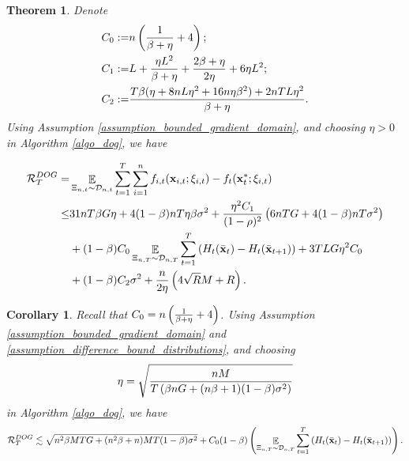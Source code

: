 \documentclass{article}
\newtheorem{Theorem}{\bf{Theorem}}
\newtheorem{Corollary}{\bf{Corollary}}
\begin{document}
\begin{Theorem}
\label{theorem_regret_upper_bound}
Denote 
\begin{align}
\nonumber
C_0 := & n\left( \frac{1}{\beta + \eta} + 4 \right); \\ \nonumber
C_1 := & L +  \frac{\eta L^2}{\beta + \eta} + \frac{2\beta + \eta}{2\eta} + 6\eta L^2; \\ \nonumber
C_2 := & \frac{T\beta(\eta + 8nL\eta^2 + 16n\eta\beta^2) + 2nTL\eta^2}{\beta + \eta }.
\end{align} Using Assumption \ref{assumption_bounded_gradient_domain}, and choosing $\eta>0$ in Algorithm \ref{algo_dog}, we have

\begin{align}
\nonumber
{\mathcal{R}}_T^{DOG} = & \mathop{\mathbb{E}}_{ \Xi_{n,t} \sim \mathcal{D}_{n,t} } \sum_{t=1}^T\sum_{i=1}^n f_{i,t}({\bf x}_{i,t};\xi_{i,t}) - f_t({\bf x}_t^\ast;\xi_{i,t}) \\ \nonumber
\le & 31 nT\beta G \eta + 4(1-\beta)nT\eta \beta\sigma^2 +  \frac{\eta^2C_1}{(1-\rho)^2}   \left(  6nTG + 4(1-\beta)nT \sigma^2  \right) \\ \nonumber 
&+ (1-\beta) C_0  \mathop{\mathbb{E}}_{ \Xi_{n,T} \sim \mathcal{D}_{n,T} }\sum_{t=1}^T \left( H_t(\bar{{\bf x}}_t) - H_t(\bar{{\bf x}}_{t+1}) \right) + 3TLG\eta^2C_0 \\ \nonumber 
& + (1-\beta) C_2  \sigma^2  + \frac{n}{2\eta}\left(  4\sqrt{R}M + R   \right).
\end{align} 
\end{Theorem}


\begin{Corollary}
Recall that $C_0 = n\left(  \frac{1}{\beta + \eta} + 4 \right)$.
Using Assumption \ref{assumption_bounded_gradient_domain} and \ref{assumption_difference_bound_distributions}, and choosing 
\begin{align}
\nonumber
\eta = \sqrt{  \frac{nM }{ T \left(  \beta nG + (n\beta+1)(1-\beta)\sigma^2  \right)  }  }
\end{align} in Algorithm \ref{algo_dog}, we have
\begin{align}
\nonumber
{\mathcal{R}}_T^{DOG} \lesssim \sqrt{ n^2 \beta MTG + (n^2\beta + n)MT(1-\beta)\sigma^2 } + C_0 (1-\beta) \left(  \mathop{\mathbb{E}}_{ \Xi_{n,T} \sim \mathcal{D}_{n,T} }\sum_{t=1}^T \left( H_t(\bar{{\bf x}}_t) - H_t(\bar{{\bf x}}_{t+1}) \right)  \right).
\end{align}






\end{Corollary}
\end{document}
